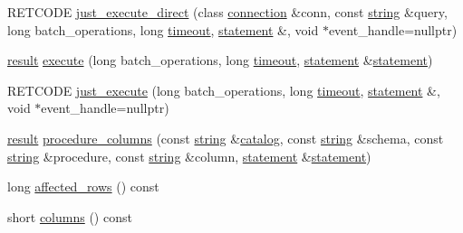 \begin{DoxyCompactItemize}
\item 
R\+E\+T\+C\+O\+DE \mbox{\hyperlink{classnanodbc_1_1statement_1_1statement__impl_a25cb3555f5ccec43b844cb33996cac97}{just\+\_\+execute\+\_\+direct}} (class \mbox{\hyperlink{classnanodbc_1_1connection}{connection}} \&conn, const \mbox{\hyperlink{namespacenanodbc_abfc0ece56278e590911ec8352774c212}{string}} \&query, long batch\+\_\+operations, long \mbox{\hyperlink{classnanodbc_1_1statement_1_1statement__impl_abccb352dfb3ba5143c049017062b9dbd}{timeout}}, \mbox{\hyperlink{classnanodbc_1_1statement}{statement}} \&, void $\ast$event\+\_\+handle=nullptr)
\item 
\mbox{\hyperlink{classnanodbc_1_1result}{result}} \mbox{\hyperlink{classnanodbc_1_1statement_1_1statement__impl_ac0a71bdfc730c230ed63844063617297}{execute}} (long batch\+\_\+operations, long \mbox{\hyperlink{classnanodbc_1_1statement_1_1statement__impl_abccb352dfb3ba5143c049017062b9dbd}{timeout}}, \mbox{\hyperlink{classnanodbc_1_1statement}{statement}} \&\mbox{\hyperlink{classnanodbc_1_1statement}{statement}})
\item 
R\+E\+T\+C\+O\+DE \mbox{\hyperlink{classnanodbc_1_1statement_1_1statement__impl_ad810dcade95494a6f6fceeb702ca4367}{just\+\_\+execute}} (long batch\+\_\+operations, long \mbox{\hyperlink{classnanodbc_1_1statement_1_1statement__impl_abccb352dfb3ba5143c049017062b9dbd}{timeout}}, \mbox{\hyperlink{classnanodbc_1_1statement}{statement}} \&, void $\ast$event\+\_\+handle=nullptr)
\item 
\mbox{\hyperlink{classnanodbc_1_1result}{result}} \mbox{\hyperlink{classnanodbc_1_1statement_1_1statement__impl_a26d9e6edf3dd6601cc6e96fa17f1b057}{procedure\+\_\+columns}} (const \mbox{\hyperlink{namespacenanodbc_abfc0ece56278e590911ec8352774c212}{string}} \&\mbox{\hyperlink{classnanodbc_1_1catalog}{catalog}}, const \mbox{\hyperlink{namespacenanodbc_abfc0ece56278e590911ec8352774c212}{string}} \&schema, const \mbox{\hyperlink{namespacenanodbc_abfc0ece56278e590911ec8352774c212}{string}} \&procedure, const \mbox{\hyperlink{namespacenanodbc_abfc0ece56278e590911ec8352774c212}{string}} \&column, \mbox{\hyperlink{classnanodbc_1_1statement}{statement}} \&\mbox{\hyperlink{classnanodbc_1_1statement}{statement}})
\item 
long \mbox{\hyperlink{classnanodbc_1_1statement_1_1statement__impl_a7360577d692af2d229688b07820a9851}{affected\+\_\+rows}} () const
\item 
short \mbox{\hyperlink{classnanodbc_1_1statement_1_1statement__impl_a40d949ca5677109a80cd99448b7f3bcc}{columns}} () const
\item 

\end{DoxyCompactItemize}
